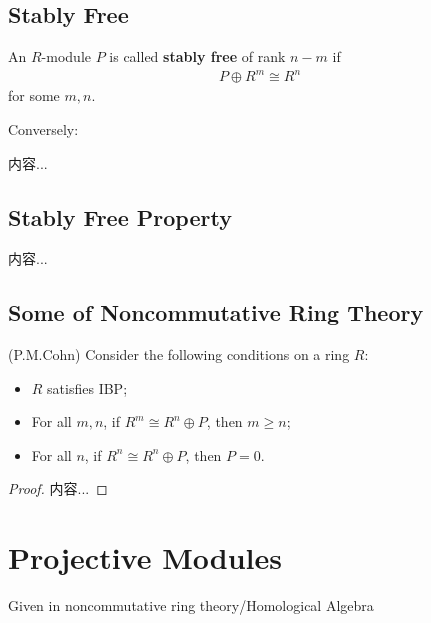 \documentclass[Total.tex]{subfiles}
\begin{document}
	\subsection{Stably Free}
	
	\begin{Def}
		An $R$-module $P$ is called \textbf{stably free} of rank $n-m$ if
		\begin{gather*}
			P\oplus R^m\cong R^n
		\end{gather*}
		for some $m,n$. 
		
		Conversely:
	\end{Def}
	
	\begin{example}
		内容...
	\end{example}
	
	
	
	\subsection{Stably Free Property}
	
	\begin{Def}
		内容...
	\end{Def}
	
	\subsection{Some of Noncommutative Ring Theory}
	
	\begin{proposition}
		(P.M.Cohn) Consider the following conditions on a ring $R$:
		
		\begin{itemize}
			\item $R$ satisfies IBP;
			\item For all $m,n$, if $R^m\cong R^n\oplus P$, then $m\geq n$;
			\item For all $n$, if $R^n\cong R^n\oplus P$, then $P=0$.
		\end{itemize}
	\end{proposition}
	
	\begin{proof}
		内容...
	\end{proof}
	
	\section{Projective Modules}
	
	Given in noncommutative ring theory/Homological Algebra
	
\end{document}
